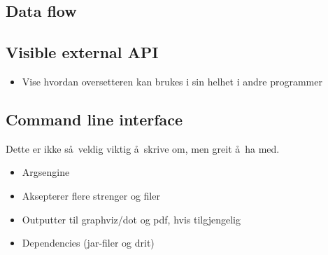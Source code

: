\subsection{Data flow}

\subsection{Visible external API}
\begin{itemize}
  \item Vise hvordan oversetteren kan brukes i sin helhet i andre programmer
\end{itemize}

\subsection{Command line interface}
Dette er ikke s\aa~veldig viktig \aa~skrive om, men greit \aa~ha med.
\begin{itemize}
  \item Argsengine
  \item Aksepterer flere strenger og filer
  \item Outputter til graphviz/dot og pdf, hvis tilgjengelig
  \item Dependencies (jar-filer og drit)
\end{itemize}